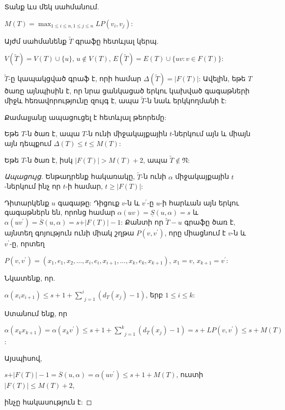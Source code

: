 Տանք ևս մեկ սահմանում.
\begin{center}
$M(T)={\max }_{1\leq i\leq n, 1\leq j\leq n}LP(v_{i},v_{j})$:
\end{center}

Այժմ սահմանենք $\widetilde{T}$ գրաֆը հետևյալ կերպ.
\begin{center}
$V(\widetilde{T})=V(T)\cup \{u\}$, $u\notin V(T)$,
$E(\widetilde{T})=E(T)\cup \{uv:v\in F(T)\}$:
\end{center}

$\widetilde{T}$-ը կապակցված գրաֆ է, որի համար 
$\Delta(\widetilde{T})=\vert F(T)\vert$: Ավելին, եթե $T$ ծառը այնպիսին է, որ նրա ցանկացած երկու կախված գագաթների միջև հեռավորությունը զույգ է, ապա 
$\widetilde{T}$-ն նաև երկկողմանի է:

Քամալյանը \cite{Kamalian1989,Kamalian1990} ապացուցել է հետևյալ թեորեմը:

\begin{theorem}
\label{t3_Kamalian_tree} Եթե $T$-ն ծառ է, ապա $T$-ն ունի միջակայքային $t$-ներկում այն և միայն այն դեպքում $\Delta(T)\leq t\leq M(T)$:
\end{theorem}

\begin{theorem}
\label{t3_tree} Եթե $T$-ն ծառ է, իսկ $\vert F(T)\vert >
M(T)+2$, ապա $\widetilde{T}\notin \mathfrak{N}$:
\end{theorem}
\begin{proof}[Ապացույց]
Ենթադրենք հակառակը, $\widetilde{T}$-ն ունի $\alpha$ միջակայքային $t$-ներկում ինչ որ $t$-ի համար, $t\geq \vert F(T)\vert$:

Դիտարկենք $u$ գագաթը: Դիցուք $v$-ն և $v^{\prime}$-ը $u$-ի հարևան այն երկու գագաթներն են, որոնց համար $\alpha(uv)=\underline{S}(u,\alpha)=s$ և
$\alpha(uv^{\prime})=\overline{S}(u,\alpha)=s+\vert F(T)\vert-1$: Քանտի որ $\widetilde{T}-u$ գրաֆը ծառ է, այնտեղ գոյություն ունի միակ շղթա
$P(v,v^{\prime})$, որը միացնում է $v$-ն և $v^{\prime}$-ը, որտեղ
\begin{center}
$P(v,v^{\prime})=(x_{1},e_{1},x_{2},\ldots,x_{i},e_{i},x_{i+1},\ldots,x_{k},e_{k},x_{k+1})$,
$x_{1}=v$, $x_{k+1}=v^{\prime}$:
\end{center}

Նկատենք, որ.
\begin{center}
$\alpha(x_{i}x_{i+1})\leq s+1+\underset{j=1}{\overset{i}{\sum
}}(d_{T}(x_{j})-1)$, երբ $1\leq i\leq k$:
\end{center}

Ստանում ենք, որ
\begin{center}
$\alpha(x_{k}x_{k+1})=\alpha(x_{k}v^{\prime})\leq
s+1+\underset{j=1}{\overset{k}{\sum
}}(d_{T}(x_{j})-1)=s+LP(v,v^{\prime})\leq s+M(T)$:
\end{center}

Այսպիսով,
\begin{center}
$s+\vert F(T)\vert -1=\overline{S}(u,\alpha)=\alpha(uv^{\prime})\leq
s+1+M(T)$, ուստի $\vert F(T)\vert\leq M(T)+2$,
\end{center}
ինչը հակասություն է:
\end{proof}

